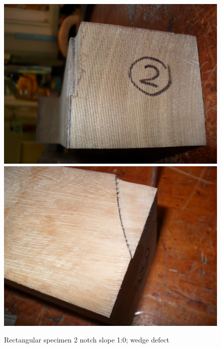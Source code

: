 \documentclass[11pt,a4paper]{article}
\numberwithin{equation}{subsection}
\begin{document}
\begin{figure}[h]
	\begin{center}
		\includegraphics[scale=0.065]{End_wedge}
		\includegraphics[scale=0.065]{Top_wedge}
	\end{center}
	\caption{Rectangular specimen 2 notch slope 1:0; wedge defect}
	\label{fig:Rect_2_wedge}
\end{figure}

\pagebreak
\end{document}
